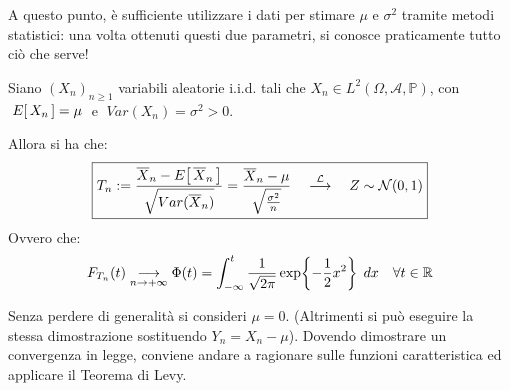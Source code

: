 \medskip
\noindent
A questo punto, è sufficiente utilizzare i dati per stimare $\mu$ e $\sigma^2$ 
tramite metodi statistici: una volta ottenuti questi due parametri, si conosce 
praticamente tutto ciò che serve!

\begin{teorema}
    Siano $(X_n)_{n\geq1}$ variabili aleatorie i.i.d. tali che $X_n\in L^2(\Omega, \mathcal{A}, \mathbb P)$, con $\;E\!\left[\,X_n\,\right] = \mu\;$ e $\;Var(X_n) = \sigma^2 >0$.
    
    \medskip Allora si ha che:
    \[\boxed{T_n := \frac{\overline{X}_n - E\!\left[\,\overline{X}_n \,\right]}{\sqrt{Var(\overline{X}_n )}} = \frac{\overline{X}_n  - \mu}{\sqrt{\frac{\sigma^2}n{}}}\quad \overset{\mathcal{L}}{\longrightarrow}\quad Z\sim \mathcal{N}(0, 1)}\]
    Ovvero che:
    \[F_{T_n} (t) \underset{n\to+\infty}{\longrightarrow} \Phi(t) = \int_{-\infty}^t\frac{1}{\sqrt{2\pi}}\exp\!\left\{-\frac12x^2 \right\}\;dx\quad \forall t\in\mathbb{R}\]

    \begin{dimostrazione}
        Senza perdere di generalità si consideri $\mu = 0$. (Altrimenti si può eseguire la stessa dimostrazione sostituendo $Y_n = X_n - \mu$). Dovendo dimostrare un convergenza in legge, conviene andare a ragionare sulle funzioni caratteristica ed applicare il Teorema di Levy.


\end{dimostrazione}
\end{teorema}
